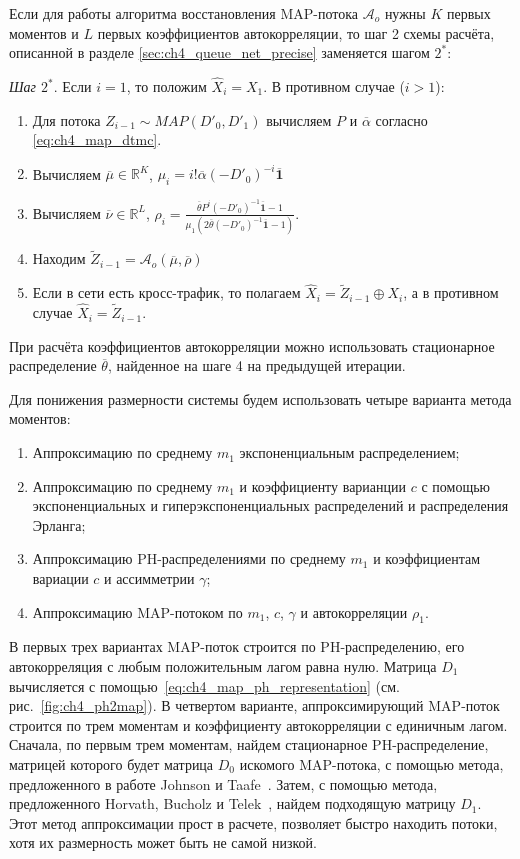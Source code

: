Если для работы алгоритма восстановления MAP-потока $\mathcal{A}_o$ нужны $K$ первых моментов и $L$ первых коэффициентов автокорреляции, то шаг 2 схемы расчёта, описанной в разделе \ref{sec:ch4_queue_net_precise} заменяется шагом $2^*$:

\textit{Шаг $2^*$}. Если $i = 1$, то положим $\hat{X}_i = X_1$. В противном случае ($i > 1$):
\begin{enumerate}
\item Для потока $Z_{i-1} \sim MAP(D'_0, D'_1)$ вычисляем $P$ и $\overline\alpha$ согласно \eqref{eq:ch4_map_dtmc}.
\item Вычисляем $\overline\mu \in \mathbb{R}^{K}$, $\mu_i = i! \overline\alpha (-D'_0)^{-i} \overline{\mathbf{1}}$
\item Вычисляем $\overline\nu \in \mathbb{R}^{L}$, $\rho_i = \frac{\overline\theta P^i (-D'_0)^{-1} \overline{\mathbf{1}} - 1}{\mu_1 \left( 2 \overline\theta (-D'_0)^{-1} \overline{\mathbf{1}} - 1 \right)}$.
\item Находим $\tilde{Z}_{i-1} = \mathcal{A}_o(\overline\mu, \overline\rho)$
\item Если в сети есть кросс-трафик, то полагаем $\hat{X}_i = \tilde{Z}_{i-1} \oplus X_i$, а в противном случае $\hat{X}_i = \tilde{Z}_{i-1}$.
\end{enumerate}
При расчёта коэффициентов автокорреляции можно использовать стационарное распределение $\overline\theta$, найденное на шаге 4 на предыдущей итерации.

Для понижения размерности системы будем использовать четыре варианта метода моментов:

\begin{enumerate}
\item Аппроксимацию по среднему $m_1$ экспоненциальным распределением;
\item Аппроксимацию по среднему $m_1$ и коэффициенту варианции $c$ с помощью экспоненциальных и гиперэкспоненциальных распределений и распределения Эрланга;
\item Аппроксимацию PH-распределениями по среднему $m_1$ и коэффициентам вариации $c$ и ассимметрии $\gamma$;
\item Аппроксимацию MAP-потоком по $m_1$, $c$, $\gamma$ и автокорреляции $\rho_1$.
\end{enumerate}

В первых трех вариантах MAP-поток строится по PH-распределению, его автокорреляция с любым положительным лагом равна нулю. Матрица $D_1$ вычисляется с помощью~\eqref{eq:ch4_map_ph_representation} (см. рис.~\ref{fig:ch4_ph2map}). В четвертом варианте, аппроксимирующий MAP-поток строится по трем моментам и коэффициенту автокорреляции с единичным лагом. Сначала, по первым трем моментам, найдем стационарное PH-распределение, матрицей которого будет матрица $D_0$ искомого MAP-потока, с помощью метода, предложенного в работе Johnson и Taafe~\cite{Johnson1989}. Затем, с помощью метода, предложенного Horvath, Bucholz и Telek~\cite{Horvath2005}, найдем подходящую матрицу $D_1$. Этот метод аппроксимации прост в расчете, позволяет быстро находить потоки, хотя их размерность может быть не самой низкой.

